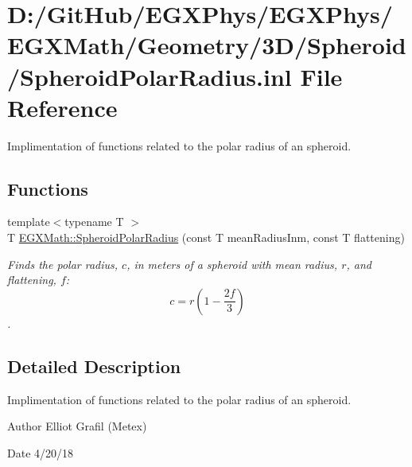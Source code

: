 \hypertarget{_spheroid_polar_radius_8inl}{}\section{D\+:/\+Git\+Hub/\+E\+G\+X\+Phys/\+E\+G\+X\+Phys/\+E\+G\+X\+Math/\+Geometry/3\+D/\+Spheroid/\+Spheroid\+Polar\+Radius.inl File Reference}
\label{_spheroid_polar_radius_8inl}


Implimentation of functions related to the polar radius of an spheroid.  


\subsection*{Functions}
\begin{DoxyCompactItemize}
\item 
{\footnotesize template$<$typename T $>$ }\\T \mbox{\hyperlink{group___e_g_x_math-_geometry-3_d-_spheroid-_polar_radius_gad4791a46a7efe39c63c03d2366fdd3d2}{E\+G\+X\+Math\+::\+Spheroid\+Polar\+Radius}} (const T mean\+Radius\+Inm, const T flattening)
\begin{DoxyCompactList}\small\item\em Finds the polar radius, $c$, in meters of a spheroid with mean radius, $r$, and flattening, $f$\+: \[ c = r \left (1 - \dfrac{2f}{3} \right ) \]. \end{DoxyCompactList}\end{DoxyCompactItemize}


\subsection{Detailed Description}
Implimentation of functions related to the polar radius of an spheroid. 

\begin{DoxyAuthor}{Author}
Elliot Grafil (Metex) 
\end{DoxyAuthor}
\begin{DoxyDate}{Date}
4/20/18 
\end{DoxyDate}
